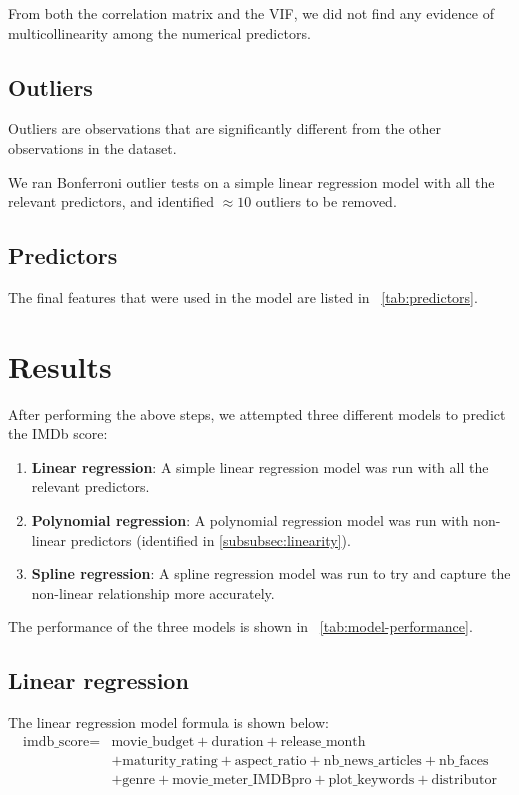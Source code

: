 \documentclass[12pt,a4paper]{article}
\begin{document}
From both the correlation matrix and the VIF, we did not find any evidence of multicollinearity among the numerical predictors.

\subsection{Outliers}\label{subsec:outliers}
Outliers are observations that are significantly different from the other observations in the dataset.

We ran Bonferroni outlier tests on a simple linear regression model with all the relevant predictors, and identified $\approx 10$ outliers to be removed.

\subsection{Predictors}\label{subsec:predictors}
The final features that were used in the model are listed in \tablename~\ref{tab:predictors}.

\section{Results}\label{sec:results}
After performing the above steps, we attempted three different models to predict the IMDb score:
\begin{enumerate}
    \item \textbf{Linear regression}: A simple linear regression model was run with all the relevant predictors.
    \item \textbf{Polynomial regression}: A polynomial regression model was run with non-linear predictors (identified in \ref{subsubsec:linearity}).
    \item \textbf{Spline regression}: A spline regression model was run to try and capture the non-linear relationship more accurately.
\end{enumerate}

The performance of the three models is shown in \tablename~\ref{tab:model-performance}.

\subsection{Linear regression}\label{subsec:linear-regression}
The linear regression model formula is shown below:
\begin{equation*}
    \begin{split}
        \text{imdb\_score} = & \text{movie\_budget} + \text{duration} + \text{release\_month}                                  \\
                             & + \text{maturity\_rating} + \text{aspect\_ratio} + \text{nb\_news\_articles} + \text{nb\_faces} \\
                             & + \text{genre} + \text{movie\_meter\_IMDBpro} + \text{plot\_keywords} + \text{distributor}
    \end{split}
\end{equation*}
\end{document}
